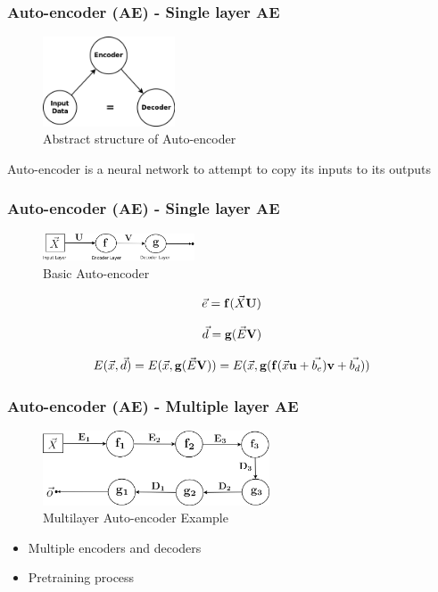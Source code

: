 \documentclass{beamer}
\begin{document}
\begin{frame}
\frametitle{Auto-encoder (AE) - Single layer AE}
\begin{figure}[t!]
    \centering
    \includegraphics[width=0.35\textwidth]{../paper/pictures/figures/AE.png}
    \caption{Abstract structure of Auto-encoder}
    \label{fig:AE}
\end{figure}

Auto-encoder is a neural network to attempt to copy its inputs to its outputs \cite{Goodfellow-et-al-2016}
\end{frame}

\begin{frame}
\frametitle{Auto-encoder (AE) - Single layer AE}
\begin{figure}[t!]
    \centering
    \includegraphics[width=0.4\textwidth]{../paper/pictures/figures/basic_AE.png}
    \caption{Basic Auto-encoder}
    \label{fig:basic_AE}
\end{figure}

$$\vec{e} = \bold{f}(\vec{X}\bold{U})$$

$$\vec{d} = \bold{g}(\vec{E}\bold{V})$$

$$E(\vec{x}, \vec{d}) = E(\vec{x}, \bold{g}(\vec{E}\bold{V})) = E(\vec{x}, \bold{g}(\bold{f}(\vec{x}\bold{u}+\vec{b_e})\bold{v}+\vec{b_d}))$$
\end{frame}

\begin{frame}
\frametitle{Auto-encoder (AE) - Multiple layer AE}
\begin{figure}[t!]
    \centering
    \includegraphics[width=0.6\textwidth]{../paper/pictures/figures/example_MAE.png}
    \caption{Multilayer Auto-encoder Example}
    \label{fig:example_MAE}
\end{figure}

\begin{itemize}
\item Multiple encoders and decoders
\item Pretraining process \cite{hinton2006reducing}
\end{itemize}
\end{frame}
\end{document}
